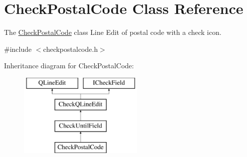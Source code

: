 \hypertarget{classCheckPostalCode}{\section{Check\+Postal\+Code Class Reference}
\label{classCheckPostalCode}
}


The \hyperlink{classCheckPostalCode}{Check\+Postal\+Code} class Line Edit of postal code with a check icon.  




{\ttfamily \#include $<$checkpostalcode.\+h$>$}

Inheritance diagram for Check\+Postal\+Code\+:\begin{figure}[H]
\begin{center}
\leavevmode
\includegraphics[height=4.000000cm]{dc/d63/classCheckPostalCode}
\end{center}
\end{figure}
